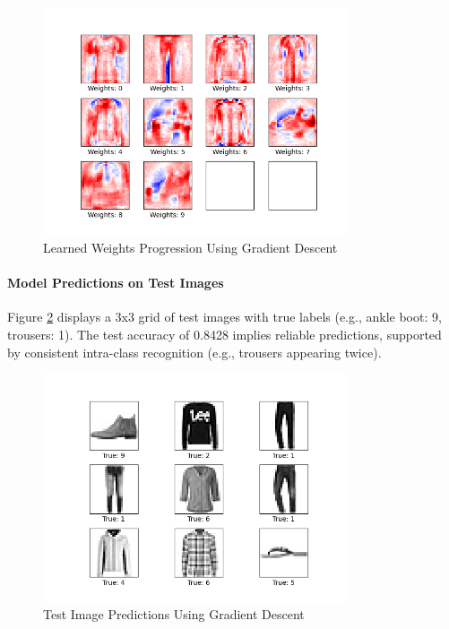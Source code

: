 \documentclass{article}
\begin{document}
\begin{figure}[H]
    \centering
    \includegraphics[width=0.8\textwidth]{assets/q2/gradient_descent/weights_50_epochs.png}
    \caption{Learned Weights Progression Using Gradient Descent}
    \label{fig:gd_weights}
\end{figure}

\paragraph{Model Predictions on Test Images}

Figure \ref{fig:gd_images} displays a 3x3 grid of test images with true labels (e.g., ankle boot: 9, trousers: 1). The test accuracy of 0.8428 implies reliable predictions, supported by consistent intra-class recognition (e.g., trousers appearing twice).

\begin{figure}[H]
    \centering
    \includegraphics[width=0.8\textwidth]{assets/q2/gradient_descent/images_50_epochs.png}
    \caption{Test Image Predictions Using Gradient Descent}
    \label{fig:gd_images}
\end{figure}
\end{document}
